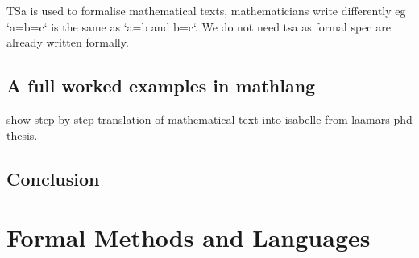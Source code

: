 TSa is used to formalise mathematical texts, mathematicians write differently eg `a=b=c` is the same as `a=b and b=c`. We do not need tsa as formal spec are already written formally.

\subsection{A full worked examples in mathlang}

show step by step translation of mathematical text into isabelle from laamars phd thesis.

\subsection{Conclusion}

\section{Formal Methods and Languages}
\label{sec:formalmethodsandformallanguages}

